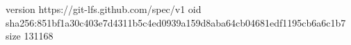 version https://git-lfs.github.com/spec/v1
oid sha256:851bf1a30c403e7d4311b5c4ed0939a159d8aba64cb04681edf1195cb6a6c1b7
size 131168
